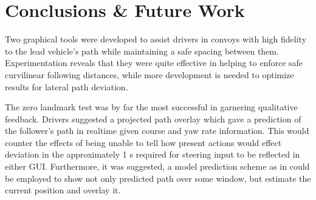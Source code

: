 \chapter{Conclusions \& Future Work} \label{chap:concl}

Two graphical tools were developed to assist drivers in convoys with high fidelity to the lead vehicle's path while maintaining a safe spacing between them. 
Experimentation reveals that they were quite effective in helping to enforce safe curvilinear following distances, while more development is needed to optimize results for lateral path deviation.

The zero landmark test was by far the most successful in garnering qualitative feedback. Drivers suggested a projected path overlay which gave a prediction of the follower's path in realtime given course and yaw rate information. This would counter the effects of being unable to tell how present actions would effect deviation in the approximately 1 s required for steering input to be reflected in either GUI. Furthermore, it was suggested, a model prediction scheme as in \cite{williamthesis} could be employed to show not only predicted path over some window, but estimate the current position and overlay it.